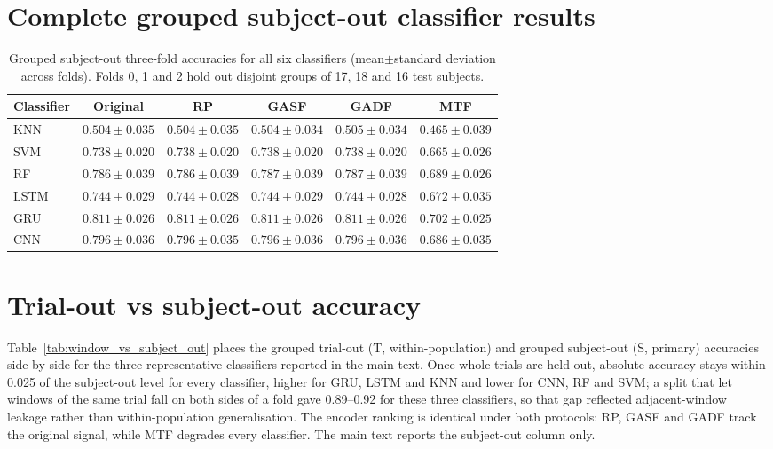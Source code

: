 \documentclass[10pt,a4paper,parskip=half-]{scrartcl}
\begin{document}
\section{Complete grouped subject-out classifier results}
\begin{table}[H]
\centering
\caption{Grouped subject-out three-fold accuracies for all six classifiers (mean$\pm$standard deviation across folds). Folds 0, 1 and 2 hold out disjoint groups of 17, 18 and 16 test subjects.}
\label{tab:gadf_summary_perfold_subject_out}
\setlength{\tabcolsep}{5pt}
\footnotesize
\begin{tabular}{lccccc}
\toprule
Classifier & Original & RP & GASF & GADF & MTF \\
\midrule
KNN  & $0.504\pm0.035$ & $0.504\pm0.035$ & $0.504\pm0.034$ & $0.505\pm0.034$ & $0.465\pm0.039$ \\
SVM  & $0.738\pm0.020$ & $0.738\pm0.020$ & $0.738\pm0.020$ & $0.738\pm0.020$ & $0.665\pm0.026$ \\
RF   & $0.786\pm0.039$ & $0.786\pm0.039$ & $0.787\pm0.039$ & $0.787\pm0.039$ & $0.689\pm0.026$ \\
LSTM & $0.744\pm0.029$ & $0.744\pm0.028$ & $0.744\pm0.029$ & $0.744\pm0.028$ & $0.672\pm0.035$ \\
GRU  & $0.811\pm0.026$ & $0.811\pm0.026$ & $0.811\pm0.026$ & $0.811\pm0.026$ & $0.702\pm0.025$ \\
CNN  & $0.796\pm0.036$ & $0.796\pm0.035$ & $0.796\pm0.036$ & $0.796\pm0.036$ & $0.686\pm0.035$ \\
\bottomrule
\end{tabular}
\end{table}

\section{Trial-out vs subject-out accuracy}
\label{sec:supp_window_vs_subject}
Table~\ref{tab:window_vs_subject_out} places the grouped trial-out (T, within-population) and grouped subject-out (S, primary) accuracies side by side for the three representative classifiers reported in the main text. Once whole trials are held out, absolute accuracy stays within 0.025 of the subject-out level for every classifier, higher for GRU, LSTM and KNN and lower for CNN, RF and SVM; a split that let windows of the same trial fall on both sides of a fold gave 0.89--0.92 for these three classifiers, so that gap reflected adjacent-window leakage rather than within-population generalisation. The encoder ranking is identical under both protocols: RP, GASF and GADF track the original signal, while MTF degrades every classifier. The main text reports the subject-out column only.
\end{document}
